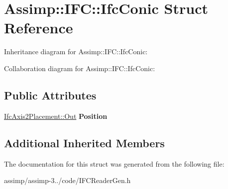 \hypertarget{struct_assimp_1_1_i_f_c_1_1_ifc_conic}{\section{Assimp\+:\+:I\+F\+C\+:\+:Ifc\+Conic Struct Reference}
\label{struct_assimp_1_1_i_f_c_1_1_ifc_conic}
}


Inheritance diagram for Assimp\+:\+:I\+F\+C\+:\+:Ifc\+Conic\+:


Collaboration diagram for Assimp\+:\+:I\+F\+C\+:\+:Ifc\+Conic\+:
\subsection*{Public Attributes}
\begin{DoxyCompactItemize}
\item 
\hypertarget{struct_assimp_1_1_i_f_c_1_1_ifc_conic_a3da5df27156ef3453ea635fadb96ed38}{\hyperlink{classboost_1_1shared__ptr}{Ifc\+Axis2\+Placement\+::\+Out} {\bfseries Position}}\label{struct_assimp_1_1_i_f_c_1_1_ifc_conic_a3da5df27156ef3453ea635fadb96ed38}

\end{DoxyCompactItemize}
\subsection*{Additional Inherited Members}


The documentation for this struct was generated from the following file\+:\begin{DoxyCompactItemize}
\item 
assimp/assimp-\/3../code/I\+F\+C\+Reader\+Gen.\+h\end{DoxyCompactItemize}
